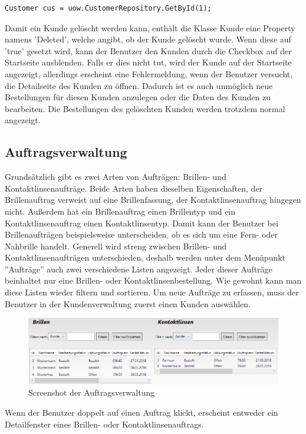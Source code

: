 \begin{lstlisting}
Customer cus = uow.CustomerRepository.GetById(1);
\end{lstlisting}
Damit ein Kunde gelöscht werden kann, enthält die Klasse Kunde eine Property namens 'Deleted', welche angibt, ob der Kunde gelöscht wurde. Wenn diese auf 'true' gesetzt wird, kann der Benutzer den Kunden durch die Checkbox auf der Startseite ausblenden. Falls er dies nicht tut, wird der Kunde auf der Startseite angezeigt, allerdings erscheint eine Fehlermeldung, wenn der Benutzer versucht, die Detailseite des Kunden zu öffnen. Dadurch ist es auch unmöglich neue Bestellungen für diesen Kunden anzulegen oder die Daten des Kunden zu bearbeiten. Die Bestellungen des gelöschten Kunden werden trotzdem normal angezeigt.
\subsection{Auftragsverwaltung}
Grundsätzlich gibt es zwei Arten von Aufträgen: Brillen- und Kontaktlinsenaufträge. Beide Arten haben dieselben Eigenschaften, der Brillenauftrag verweist auf eine Brillenfassung, der Kontaktlinsenauftrag hingegen nicht. Außerdem hat ein Brillenauftrag einen Brillentyp und ein Kontaktlinsenauftrag einen Kontaktlinsentyp. Damit kann der Benutzer bei Brillenaufträgen beispielsweise unterscheiden, ob es sich um eine Fern- oder Nahbrille handelt. Generell wird streng zwischen Brillen- und Kontaktlinsenaufträgen unterschieden, deshalb werden unter dem Menüpunkt ''Aufträge'' auch zwei verschiedene Listen angezeigt. Jeder dieser Aufträge beinhaltet nur eine Brillen- oder Kontaktlinsenbestellung. Wie gewohnt kann man diese Listen wieder filtern und sortieren. Um neue Aufträge zu erfassen, muss der Benutzer in der Kundenverwaltung zuerst einen Kunden auswählen. 
\begin{figure}[H]
\begin{center}
	\includegraphics[scale=.6]{images/Auftraege.png}
\end{center}
	\caption{Screenshot der Auftragsverwaltung}
	\label{fig:sample}
\end{figure}
\noindent Wenn der Benutzer doppelt auf einen Auftrag klickt, erscheint entweder ein Detailfenster eines Brillen- oder Kontaktlinsenauftrags. 
